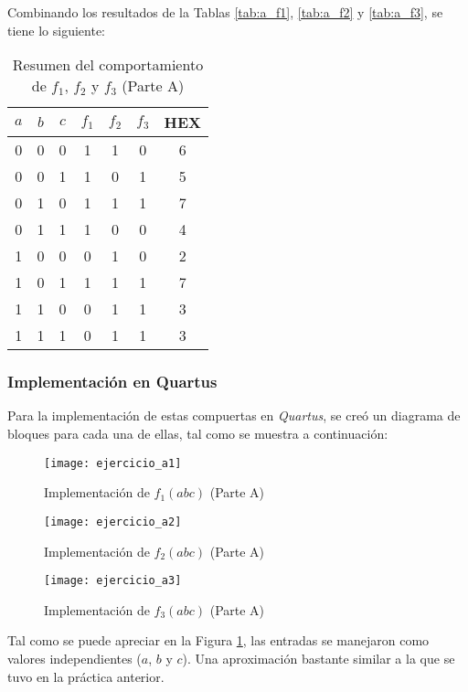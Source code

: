 \documentclass[../procedimientos.tex]{subfiles}
\begin{document}
Combinando los resultados de la Tablas \ref{tab:a_f1}, \ref{tab:a_f2} y 
\ref{tab:a_f3}, se tiene lo siguiente:
\begin{table}[H]
  \centering
  \begin{tabular}{ccc|ccc|c}
    \hline
    $a$ & $b$ & $c$ & $f_1$ & $f_2$ & $f_3$ & HEX\\
    \hline
    0 & 0 & 0 & 1 & 1 & 0 & 6\\
    0 & 0 & 1 & 1 & 0 & 1 & 5\\
    0 & 1 & 0 & 1 & 1 & 1 & 7\\
    0 & 1 & 1 & 1 & 0 & 0 & 4\\
    1 & 0 & 0 & 0 & 1 & 0 & 2\\
    1 & 0 & 1 & 1 & 1 & 1 & 7\\
    1 & 1 & 0 & 0 & 1 & 1 & 3\\
    1 & 1 & 1 & 0 & 1 & 1 & 3\\
    \hline
  \end{tabular}
  \caption{Resumen del comportamiento de $f_1$, $f_2$ y $f_3$ (Parte A)}
  \label{tab:a_summary}
\end{table}

\subsubsection{Implementación en Quartus}
Para la implementación de estas compuertas en \textit{Quartus}, se creó un 
diagrama de bloques para cada una de ellas, tal como se muestra a 
continuación:
\begin{figure}[H]
  \texttt{[image: ejercicio\_a1]}
  \caption{Implementación de $f_1(abc)$ (Parte A)}
  \label{fig:a_f1}
\end{figure}
\begin{figure}[H]
  \texttt{[image: ejercicio\_a2]}
  \caption{Implementación de $f_2(abc)$ (Parte A)}
  \label{fig:a_f2}
\end{figure}
\begin{figure}[H]
  \texttt{[image: ejercicio\_a3]}
  \caption{Implementación de $f_3(abc)$ (Parte A)}
  \label{fig:a_f3}
\end{figure}

Tal como se puede apreciar en la Figura \ref{fig:a_f1}, las entradas se 
manejaron como valores independientes ($a$, $b$ y $c$). Una aproximación 
bastante similar a la que se tuvo en la práctica anterior.
\end{document}

